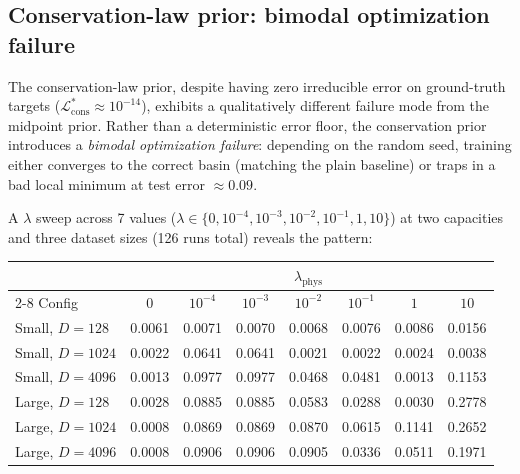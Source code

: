 \documentclass[11pt]{article}
\begin{document}
\subsection{Conservation-law prior: bimodal optimization failure}
\label{sec:results-conservation}

The conservation-law prior, despite having zero irreducible error on ground-truth targets ($\mathcal{L}_{\mathrm{cons}}^* \approx 10^{-14}$), exhibits a qualitatively different failure mode from the midpoint prior.
Rather than a deterministic error floor, the conservation prior introduces a \emph{bimodal optimization failure}: depending on the random seed, training either converges to the correct basin (matching the plain baseline) or traps in a bad local minimum at test error $\approx 0.09$.

A $\lambda$ sweep across 7 values ($\lambda \in \{0, 10^{-4}, 10^{-3}, 10^{-2}, 10^{-1}, 1, 10\}$) at two capacities and three dataset sizes (126 runs total) reveals the pattern:

\begin{center}
\small
\begin{tabular}{lccccccc}
\toprule
& \multicolumn{7}{c}{$\lambda_{\mathrm{phys}}$} \\
\cmidrule(lr){2-8}
Config & $0$ & $10^{-4}$ & $10^{-3}$ & $10^{-2}$ & $10^{-1}$ & $1$ & $10$ \\
\midrule
Small, $D\!=\!128$  & 0.0061 & 0.0071 & 0.0070 & 0.0068 & 0.0076 & 0.0086 & 0.0156 \\
Small, $D\!=\!1024$ & 0.0022 & 0.0641 & 0.0641 & 0.0021 & 0.0022 & 0.0024 & 0.0038 \\
Small, $D\!=\!4096$ & 0.0013 & 0.0977 & 0.0977 & 0.0468 & 0.0481 & 0.0013 & 0.1153 \\
\midrule
Large, $D\!=\!128$  & 0.0028 & 0.0885 & 0.0885 & 0.0583 & 0.0288 & 0.0030 & 0.2778 \\
Large, $D\!=\!1024$ & 0.0008 & 0.0869 & 0.0869 & 0.0870 & 0.0615 & 0.1141 & 0.2652 \\
Large, $D\!=\!4096$ & 0.0008 & 0.0906 & 0.0906 & 0.0905 & 0.0336 & 0.0511 & 0.1971 \\
\bottomrule
\end{tabular}
\end{center}
\end{document}
